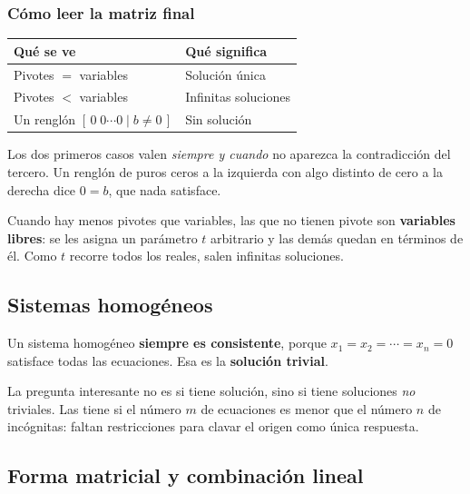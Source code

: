 \documentclass[11pt,letterpaper]{article}
\begin{document}
\subsubsection*{Cómo leer la matriz final}

\begin{center}
\begin{tabular}{ll}
    \toprule
    \textbf{Qué se ve} & \textbf{Qué significa} \\
    \midrule
    Pivotes $=$ variables & Solución única \\
    Pivotes $<$ variables & Infinitas soluciones \\
    Un renglón $[\,0\;0\cdots 0 \mid b \neq 0\,]$ & Sin solución \\
    \bottomrule
\end{tabular}
\end{center}

Los dos primeros casos valen \emph{siempre y cuando} no aparezca la
contradicción del tercero. Un renglón de puros ceros a la izquierda
con algo distinto de cero a la derecha dice $0 = b$, que nada
satisface.

Cuando hay menos pivotes que variables, las que no tienen pivote son
\textbf{variables libres}: se les asigna un parámetro $t$ arbitrario y
las demás quedan en términos de él. Como $t$ recorre todos los reales,
salen infinitas soluciones.


\subsection*{Sistemas homogéneos}

Un sistema homogéneo \textbf{siempre es consistente}, porque
$x_1 = x_2 = \cdots = x_n = 0$ satisface todas las ecuaciones. Esa es
la \textbf{solución trivial}.

\begin{idea}
  La pregunta interesante no es si tiene solución, sino si tiene
  soluciones \emph{no} triviales. Las tiene si el número $m$ de
  ecuaciones es menor que el número $n$ de incógnitas: faltan
  restricciones para clavar el origen como única respuesta.
\end{idea}


\subsection*{Forma matricial y combinación lineal}
\end{document}
